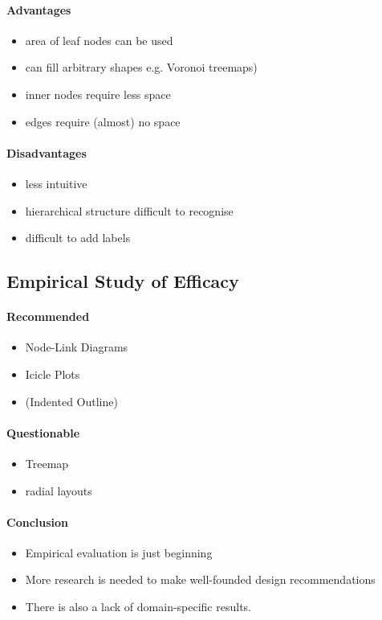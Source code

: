 \documentclass[10pt,a4paper]{article}
\begin{document}
	\paragraph{Advantages}
	\begin{itemize}
		\item area of leaf nodes can be used
		\item can fill arbitrary shapes e.g. Voronoi treemaps)
		\item inner nodes require less space
		\item edges require (almost) no space
	\end{itemize}
	\paragraph{Disadvantages}
	\begin{itemize}
		\item less intuitive
		\item hierarchical structure difficult to recognise
		\item difficult to add labels
	\end{itemize}

	\subsection{Empirical Study of Efficacy}
		\paragraph{Recommended}
		\begin{itemize}
			\item Node-Link Diagrams
			\item Icicle Plots
			\item (Indented Outline)
		\end{itemize}
		\paragraph{Questionable}
		\begin{itemize}
			\item Treemap
			\item radial layouts
		\end{itemize}
		\paragraph{Conclusion}
		\begin{itemize}
			\item Empirical evaluation is just beginning
			\item More research is needed to make well-founded design recommendations
			\item There is also a lack of domain-specific results.
		\end{itemize}
	
\end{document}

